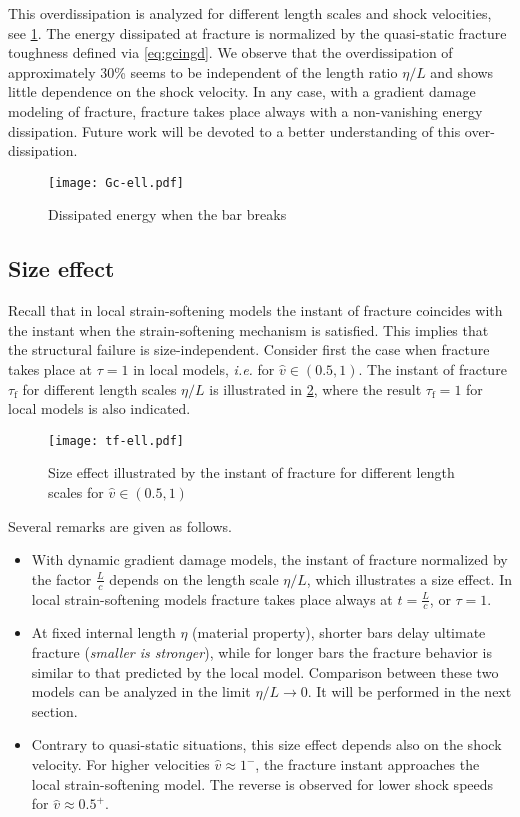 This overdissipation is analyzed for different length scales and shock velocities, see \cref{fig:Gc-ell}. The energy dissipated at fracture is normalized by the quasi-static fracture toughness defined via \eqref{eq:gcingd}. We observe that the overdissipation of approximately 30\% seems to be independent of the length ratio $\eta/L$ and shows little dependence on the shock velocity. In any case, with a gradient damage modeling of fracture, fracture takes place always with a non-vanishing energy dissipation. Future work will be devoted to a better understanding of this over-dissipation.
\begin{figure}[htbp]
\centering
\texttt{[image: Gc-ell.pdf]}
\caption{Dissipated energy when the bar breaks} \label{fig:Gc-ell}
\end{figure}

\subsection{Size effect}
Recall that in local strain-softening models the instant of fracture coincides with the instant when the strain-softening mechanism is satisfied. This implies that the structural failure is size-independent. Consider first the case when fracture takes place at $\tau=1$ in local models, \emph{i.e.} for $\widehat{v}\in(0.5,1)$. The instant of fracture $\tau_\mathrm{f}$ for different length scales $\eta/L$ is illustrated in \cref{fig:tfell}, where the result $\tau_\mathrm{f}=1$ for local models is also indicated.
\begin{figure}[htbp]
\centering
\texttt{[image: tf-ell.pdf]}
\caption{Size effect illustrated by the instant of fracture for different length scales for $\widehat{v}\in(0.5,1)$} \label{fig:tfell}
\end{figure}
Several remarks are given as follows.
\begin{itemize}
\item With dynamic gradient damage models, the instant of fracture normalized by the factor $\frac{L}{c}$ depends on the length scale $\eta/L$, which illustrates a size effect. In local strain-softening models fracture takes place always at $t=\frac{L}{c}$, or $\tau=1$.

\item At fixed internal length $\eta$ (material property), shorter bars delay ultimate fracture (\emph{smaller is stronger}), while for longer bars the fracture behavior is similar to that predicted by the local model. Comparison between these two models can be analyzed in the limit $\eta/L\to 0$. It will be performed in the next section.

\item Contrary to quasi-static situations, this size effect depends also on the shock velocity. For higher velocities $\widehat{v}\approx 1^-$, the fracture instant approaches the local strain-softening model. The reverse is observed for lower shock speeds for $\widehat{v}\approx 0.5^+$.
\end{itemize}

